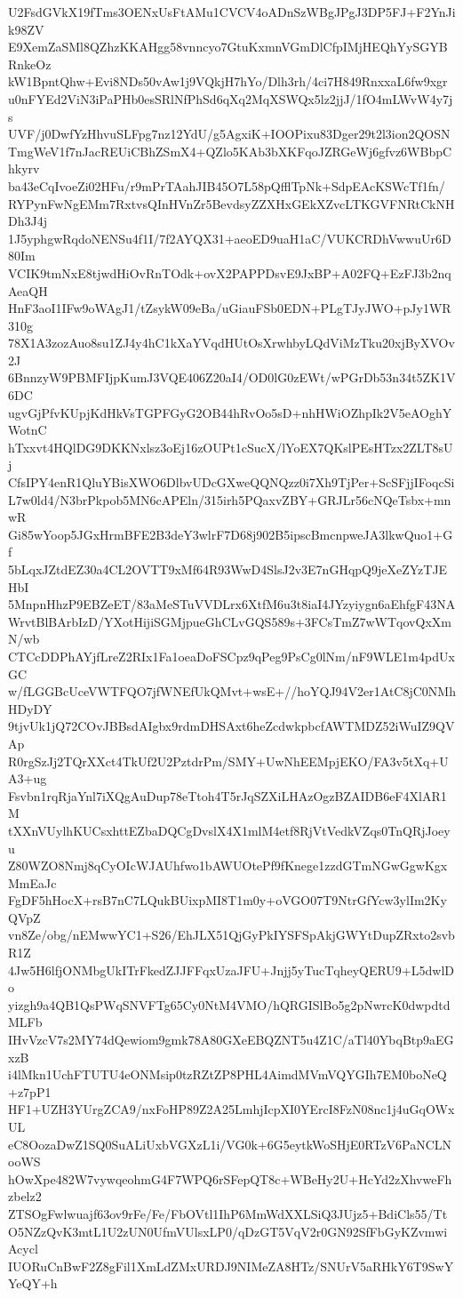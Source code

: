 U2FsdGVkX19fTms3OENxUsFtAMu1CVCV4oADnSzWBgJPgJ3DP5FJ+F2YnJik98ZV
E9XemZaSMl8QZhzKKAHgg58vnncyo7GtuKxmnVGmDlCfpIMjHEQhYySGYBRnkeOz
kW1BpntQhw+Evi8NDs50vAw1j9VQkjH7hYo/Dlh3rh/4ci7H849RnxxaL6fw9xgr
u0nFYEd2ViN3iPaPHb0esSRlNfPhSd6qXq2MqXSWQx5lz2jjJ/1fO4mLWvW4y7js
UVF/j0DwfYzHhvuSLFpg7nz12YdU/g5AgxiK+IOOPixu83Dger29t2l3ion2QOSN
TmgWeV1f7nJacREUiCBhZSmX4+QZlo5KAb3bXKFqoJZRGeWj6gfvz6WBbpChkyrv
ba43eCqIvoeZi02HFu/r9mPrTAahJIB45O7L58pQfflTpNk+SdpEAcKSWcTf1fn/
RYPynFwNgEMm7RxtvsQInHVnZr5BevdsyZZXHxGEkXZvcLTKGVFNRtCkNHDh3J4j
1J5yphgwRqdoNENSu4f1I/7f2AYQX31+aeoED9uaH1aC/VUKCRDhVwwuUr6D80Im
VCIK9tmNxE8tjwdHiOvRnTOdk+ovX2PAPPDsvE9JxBP+A02FQ+EzFJ3b2nqAeaQH
HnF3aoI1IFw9oWAgJ1/tZsykW09eBa/uGiauFSb0EDN+PLgTJyJWO+pJy1WR310g
78X1A3zozAuo8su1ZJ4y4hC1kXaYVqdHUtOsXrwhbyLQdViMzTku20xjByXVOv2J
6BnnzyW9PBMFIjpKumJ3VQE406Z20aI4/OD0lG0zEWt/wPGrDb53n34t5ZK1V6DC
ugvGjPfvKUpjKdHkVsTGPFGyG2OB44hRvOo5sD+nhHWiOZhpIk2V5eAOghYWotnC
hTxxvt4HQlDG9DKKNxlsz3oEj16zOUPt1cSucX/lYoEX7QKslPEsHTzx2ZLT8sUj
CfsIPY4enR1QluYBisXWO6DlbvUDcGXweQQNQzz0i7Xh9TjPer+ScSFjjIFoqcSi
L7w0ld4/N3brPkpob5MN6cAPEln/315irh5PQaxvZBY+GRJLr56cNQeTsbx+mnwR
Gi85wYoop5JGxHrmBFE2B3deY3wlrF7D68j902B5ipscBmcnpweJA3lkwQuo1+Gf
5bLqxJZtdEZ30a4CL2OVTT9xMf64R93WwD4SlsJ2v3E7nGHqpQ9jeXeZYzTJEHbI
5MnpnHhzP9EBZeET/83aMeSTuVVDLrx6XtfM6u3t8iaI4JYzyiygn6aEhfgF43NA
WrvtBlBArbIzD/YXotHijiSGMjpueGhCLvGQS589s+3FCsTmZ7wWTqovQxXmN/wb
CTCcDDPhAYjfLreZ2RIx1Fa1oeaDoFSCpz9qPeg9PsCg0lNm/nF9WLE1m4pdUxGC
w/fLGGBcUceVWTFQO7jfWNEfUkQMvt+wsE+//hoYQJ94V2er1AtC8jC0NMhHDyDY
9tjvUk1jQ72COvJBBsdAIgbx9rdmDHSAxt6heZcdwkpbcfAWTMDZ52iWuIZ9QVAp
R0rgSzJj2TQrXXct4TkUf2U2PztdrPm/SMY+UwNhEEMpjEKO/FA3v5tXq+UA3+ug
Fsvbn1rqRjaYnl7iXQgAuDup78eTtoh4T5rJqSZXiLHAzOgzBZAIDB6eF4XlAR1M
tXXnVUylhKUCsxhttEZbaDQCgDvslX4X1mlM4etf8RjVtVedkVZqs0TnQRjJoeyu
Z80WZO8Nmj8qCyOIcWJAUhfwo1bAWUOtePf9fKnege1zzdGTmNGwGgwKgxMmEaJc
FgDF5hHocX+rsB7nC7LQukBUixpMI8T1m0y+oVGO07T9NtrGfYcw3ylIm2KyQVpZ
vn8Ze/obg/nEMwwYC1+S26/EhJLX51QjGyPkIYSFSpAkjGWYtDupZRxto2svbR1Z
4Jw5H6lfjONMbgUkITrFkedZJJFFqxUzaJFU+Jnjj5yTucTqheyQERU9+L5dwlDo
yizgh9a4QB1QsPWqSNVFTg65Cy0NtM4VMO/hQRGISlBo5g2pNwrcK0dwpdtdMLFb
IHvVzcV7s2MY74dQewiom9gmk78A80GXeEBQZNT5u4Z1C/aTl40YbqBtp9aEGxzB
i4lMkn1UchFTUTU4eONMsip0tzRZtZP8PHL4AimdMVmVQYGIh7EM0boNeQ+z7pP1
HF1+UZH3YUrgZCA9/nxFoHP89Z2A25LmhjIcpXI0YErcI8FzN08nc1j4uGqOWxUL
eC8OozaDwZ1SQ0SuALiUxbVGXzL1i/VG0k+6G5eytkWoSHjE0RTzV6PaNCLNooWS
hOwXpe482W7vywqeohmG4F7WPQ6rSFepQT8c+WBeHy2U+HcYd2zXhvweFhzbelz2
ZTSOgFwlwuajf63ov9rFe/Fe/FbOVtl1IhP6MmWdXXLSiQ3JUjz5+BdiCls55/Tt
O5NZzQvK3mtL1U2zUN0UfmVUlsxLP0/qDzGT5VqV2r0GN92SfFbGyKZvmwiAcycl
IUORuCnBwF2Z8gFil1XmLdZMxURDJ9NIMeZA8HTz/SNUrV5aRHkY6T9SwYYeQY+h
